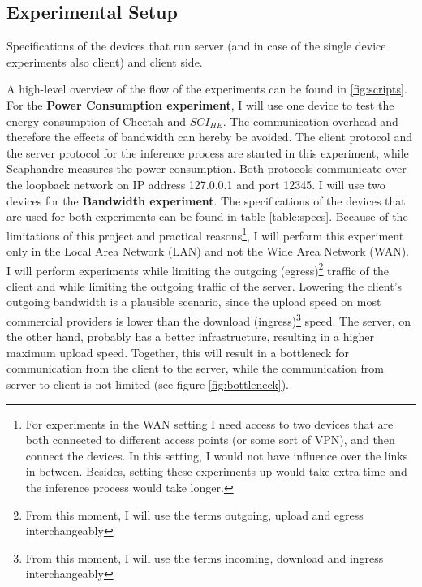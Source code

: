 \documentclass[../thesis.tex]{subfiles}
\begin{document}
\subsection{Experimental Setup}\label{subsection:setup}
\begin{table}[ht]
    \begin{adjustbox}{width=\columnwidth,center}
        
    \end{adjustbox}
    \caption{Specifications of the devices that run server (and in case of the single device experiments also client) and client side.}
    \label{table:specs}
\end{table}

A high-level overview of the flow of the experiments can be found in \autoref{fig:scripts}. For the \textbf{Power Consumption experiment}, I will use one device to test the energy consumption of Cheetah and $SCI_{HE}$. The communication overhead and therefore the effects of bandwidth can hereby be avoided. The client protocol and the server protocol for the inference process are started in this experiment, while Scaphandre measures the power consumption. Both protocols communicate over the loopback network on IP address 127.0.0.1 and port 12345. I will use two devices for the \textbf{Bandwidth experiment}. The specifications of the devices that are used for both experiments can be found in table \autoref{table:specs}. Because of the limitations of this project and practical reasons\footnote{For experiments in the WAN setting I need access to two devices that are both connected to different access points (or some sort of VPN), and then connect the devices. In this setting, I would not have influence over the links in between. Besides, setting these experiments up would take extra time and the inference process would take longer.}, I will perform this experiment only in the Local Area Network (LAN) and not the Wide Area Network (WAN).  I will perform experiments while limiting the outgoing (egress)\footnote{From this moment, I will use the terms outgoing, upload and egress interchangeably} traffic of the client and while limiting the outgoing traffic of the server. Lowering the client's outgoing bandwidth is a plausible scenario, since the upload speed on most commercial providers is lower than the download (ingress)\footnote{From this moment, I will use the terms incoming, download and ingress interchangeably} speed. The server, on the other hand, probably has a better infrastructure, resulting in a higher maximum upload speed. Together, this will result in a bottleneck for communication from the client to the server, while the communication from server to client is not limited (see figure \ref{fig:bottleneck}).
\end{document}
